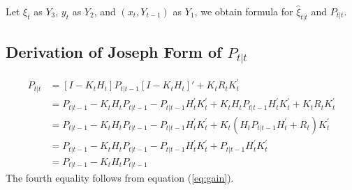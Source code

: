 \documentclass[10pt]{article}
\numberwithin{equation}{section}
\begin{document}
Let $\xi_t$ as $Y_3$, $y_t$ as $Y_2$, and $(x_t,Y_{t-1})$ as $Y_1$, we obtain formula for $\hat{\xi}_{t|t}$ and $P_{t|t}$.

\subsection{Derivation of Joseph Form of $P_{t|t}$} \label{ap:joseph}
\begin{align*}
    P_{t|t} &= [I - K_tH_t]P_{t|t-1}[I - K_tH_t]' + K_tR_tK_t^{'} \\
    &= P_{t|t-1} - K_tH_tP_{t|t-1} - P_{t|t-1}H_t^{'}K_t^{'} + K_tH_tP_{t|t-1}H_t^{'}K_t^{'} + K_tR_tK_t^{'} \\
    &= P_{t|t-1} - K_tH_tP_{t|t-1} - P_{t|t-1}H_t^{'}K_t^{'} + K_t(H_tP_{t|t-1}H_t^{'} + R_t)K_t^{'} \\
    &= P_{t|t-1} - K_tH_tP_{t|t-1} - P_{t|t-1}H_t^{'}K_t^{'} + P_{t|t-1}H_t^{'}K_t^{'} \\
    &= P_{t|t-1} - K_tH_tP_{t|t-1}
\end{align*}
The fourth equality follows from equation (\ref{eq:gain}).
\end{document}

